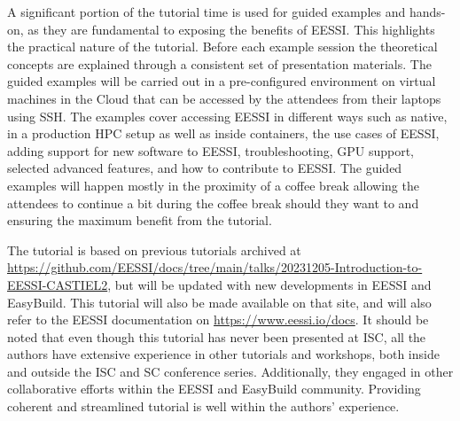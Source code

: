 A significant portion of the tutorial time is used for guided examples and hands-on,
as they are fundamental to exposing the benefits of EESSI.
This highlights the practical nature of the tutorial.
Before each example session the theoretical concepts are explained through a consistent set of presentation materials.
The guided examples will be carried out in a pre-configured environment on virtual machines in the Cloud that can be
accessed by the
attendees from their laptops using SSH. 
The examples cover accessing EESSI in different ways such as native, in a production HPC setup as well as inside
containers, the use cases of EESSI, adding support for new software to EESSI, troubleshooting, GPU support, selected
advanced features, and how to contribute to EESSI.
The guided examples will happen mostly in the proximity of a coffee break allowing the attendees to continue
a bit during the coffee break should they want to and ensuring the maximum benefit from the tutorial.

The tutorial is based on previous tutorials archived at
\url{https://github.com/EESSI/docs/tree/main/talks/20231205-Introduction-to-EESSI-CASTIEL2},
but will be updated with new developments in EESSI and EasyBuild.
This tutorial will also be made available on that site, and will also refer to the EESSI documentation on
\url{https://www.eessi.io/docs}.
It should be noted that even though this tutorial has never been presented at ISC, all the authors have extensive
experience in other tutorials and workshops, both inside and outside the ISC and SC conference series. Additionally,
they engaged in other collaborative efforts within the EESSI and EasyBuild community. Providing coherent and streamlined
tutorial is well within the authors' experience.




